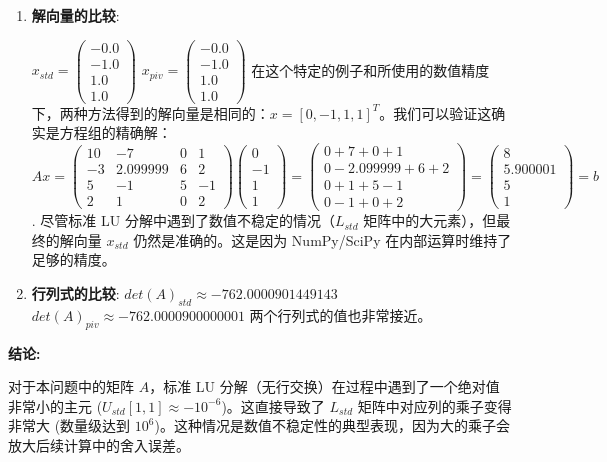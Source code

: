 \documentclass[11pt]{article}
\begin{document}
\begin{enumerate}
\def\labelenumi{\arabic{enumi}.}
\item
  \textbf{解向量的比较}:

  \(x_{std} = \begin{pmatrix} -0.0 \\ -1.0 \\ 1.0 \\ 1.0 \end{pmatrix}\)
  \(x_{piv} = \begin{pmatrix} -0.0 \\ -1.0 \\ 1.0 \\ 1.0 \end{pmatrix}\)
  在这个特定的例子和所使用的数值精度下，两种方法得到的解向量是相同的：\(x = [0, -1, 1, 1]^T\)。我们可以验证这确实是方程组的精确解：
  \(A x = \begin{pmatrix} 10 & -7 & 0 & 1\\ -3 & 2.099999 & 6 & 2\\ 5 & -1 & 5 & -1\\ 2 & 1 & 0 & 2 \end{pmatrix} \begin{pmatrix} 0 \\ -1 \\ 1 \\ 1 \end{pmatrix} = \begin{pmatrix} 0+7+0+1 \\ 0-2.099999+6+2 \\ 0+1+5-1 \\ 0-1+0+2 \end{pmatrix} = \begin{pmatrix} 8 \\ 5.900001 \\ 5 \\ 1 \end{pmatrix} = b\).
  尽管标准 LU 分解中遇到了数值不稳定的情况（\(L_{std}\)
  矩阵中的大元素），但最终的解向量 \(x_{std}\) 仍然是准确的。这是因为
  NumPy/SciPy 在内部运算时维持了足够的精度。
\item
  \textbf{行列式的比较}: \(det(A)_{std} \approx -762.0000901449143\)
  \(det(A)_{piv} \approx -762.0000900000001\) 两个行列式的值也非常接近。
\end{enumerate}

\textbf{结论:}

对于本问题中的矩阵 \(A\)，标准 LU
分解（无行交换）在过程中遇到了一个绝对值非常小的主元
(\(U_{std}[1,1] \approx -10^{-6}\))。这直接导致了 \(L_{std}\)
矩阵中对应列的乘子变得非常大 (数量级达到
\(10^6\))。这种情况是数值不稳定性的典型表现，因为大的乘子会放大后续计算中的舍入误差。
\end{document}
